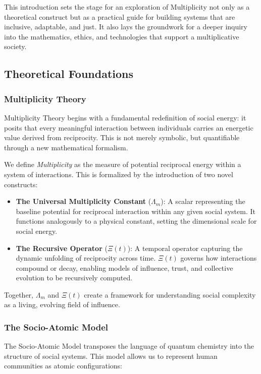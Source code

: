 \documentclass{article}
\theoremstyle{plain}
\theoremstyle{claimstyle}
\begin{document}
This introduction sets the stage for an exploration of Multiplicity not only as a theoretical construct but as a practical guide for building systems that are inclusive, adaptable, and just. It also lays the groundwork for a deeper inquiry into the mathematics, ethics, and technologies that support a multiplicative society.

\subsection{Theoretical Foundations}

\subsubsection{Multiplicity Theory}

Multiplicity Theory begins with a fundamental redefinition of social energy: it posits that every meaningful interaction between individuals carries an energetic value derived from reciprocity. This is not merely symbolic, but quantifiable through a new mathematical formalism.

We define \textit{Multiplicity} as the measure of potential reciprocal energy within a system of interactions. This is formalized by the introduction of two novel constructs:

\begin{itemize}
    \item \textbf{The Universal Multiplicity Constant} ($\Lambda_m$): A scalar representing the baseline potential for reciprocal interaction within any given social system. It functions analogously to a physical constant, setting the dimensional scale for social energy.
    \item \textbf{The Recursive Operator} ($\Xi(t)$): A temporal operator capturing the dynamic unfolding of reciprocity across time. $\Xi(t)$ governs how interactions compound or decay, enabling models of influence, trust, and collective evolution to be recursively computed.
\end{itemize}

Together, $\Lambda_m$ and $\Xi(t)$ create a framework for understanding social complexity as a living, evolving field of influence.

\subsubsection{The Socio-Atomic Model}

The Socio-Atomic Model transposes the language of quantum chemistry into the structure of social systems. This model allows us to represent human communities as atomic configurations:
\end{document}
